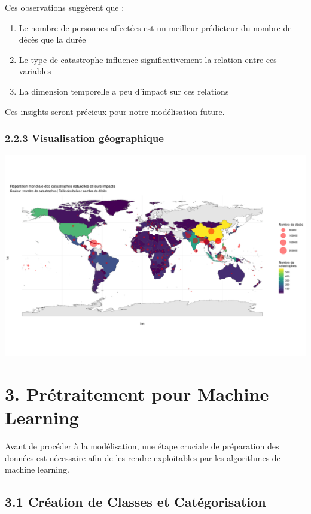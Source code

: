 \documentclass[
]{article}
\begin{document}
Ces observations suggèrent que :

\begin{enumerate}
\def\labelenumi{\arabic{enumi}.}
\item
  Le nombre de personnes affectées est un meilleur prédicteur du nombre
  de décès que la durée
\item
  Le type de catastrophe influence significativement la relation entre
  ces variables
\item
  La dimension temporelle a peu d'impact sur ces relations
\end{enumerate}

Ces insights seront précieux pour notre modélisation future.

\subsubsection{2.2.3 Visualisation
géographique}\label{visualisation-guxe9ographique}

\includegraphics{Projet_ML_files/figure-latex/map_visualization-1.pdf}

\section{3. Prétraitement pour Machine
Learning}\label{pruxe9traitement-pour-machine-learning}

Avant de procéder à la modélisation, une étape cruciale de préparation
des données est nécessaire afin de les rendre exploitables par les
algorithmes de machine learning.

\subsection{3.1 Création de Classes et
Catégorisation}\label{cruxe9ation-de-classes-et-catuxe9gorisation}
\end{document}
